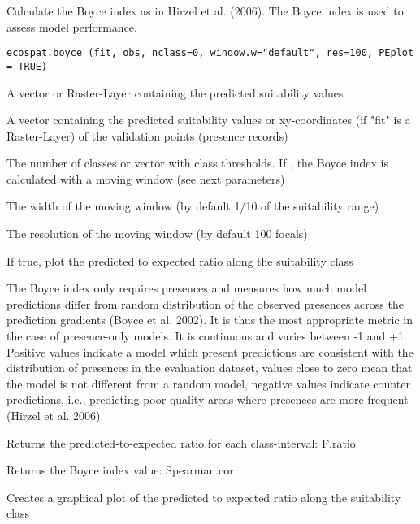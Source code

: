 \documentclass[a4paper]{book}
\begin{document}
%
\begin{Description}\relax
Calculate the Boyce index as in Hirzel et al. (2006). The Boyce index is used to assess model performance.
\end{Description}
%
\begin{Usage}
\begin{verbatim}
ecospat.boyce (fit, obs, nclass=0, window.w="default", res=100, PEplot = TRUE)
\end{verbatim}
\end{Usage}
%
\begin{Arguments}
\begin{ldescription}
\item[\code{fit}] A vector or Raster-Layer containing the predicted suitability values
\item[\code{obs}] A vector containing the predicted suitability values or xy-coordinates (if "fit" is a Raster-Layer) of the validation points (presence records)
\item[\code{nclass}] The number of classes or vector with class thresholds. If , the Boyce index is calculated with a moving window (see next parameters)
\item[\code{window.w}] The width of the moving window (by default 1/10 of the suitability range)
\item[\code{res}] The resolution of the moving window (by default 100 focals)
\item[\code{PEplot}] If true, plot the predicted to expected ratio along the suitability class
\end{ldescription}
\end{Arguments}
%
\begin{Details}\relax
The Boyce index only requires presences and measures how much model predictions differ from random distribution of the observed presences across the prediction gradients (Boyce et al. 2002). It is thus the most appropriate metric in the case of presence-only models. It is continuous and varies between -1 and +1. Positive values indicate a model which present predictions are consistent with the distribution of presences in the evaluation dataset, values close to zero mean that the model is not different from a random model, negative values indicate counter predictions, i.e., predicting poor quality areas where presences are more frequent (Hirzel et al. 2006).
\end{Details}
%
\begin{Value}
Returns the predicted-to-expected ratio for each class-interval: F.ratio

Returns the Boyce index value: Spearman.cor

Creates a graphical plot of the predicted to expected ratio along the suitability class
\end{Value}
\end{document}
